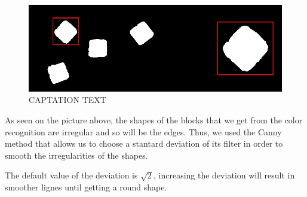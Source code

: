 	\begin{figure}[hb]
  \centering
  \includegraphics[scale=0.3]{figures/color_rec_zoom.png}
  \caption[LABEL] {CAPTATION TEXT}
\end{figure}	
	

 \begin{flushleft}
As seen on the picture above, the shapes of the blocks that we get from the color recognition are irregular and so will be the edges. Thus, we used the Canny method that allows us to choose a stantard deviation of its filter in order to smooth the irregularities of the shapes.\par 
 \end{flushleft}

\begin{flushleft}
The default value of the deviation is $\sqrt{2}$, increasing the deviation will result in smoother lignes until getting a round shape.
\end{flushleft}

